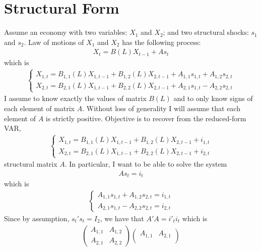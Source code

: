 \documentclass[14pt]{article}
\begin{document}
	
	\large{

\section*{Structural Form}

Assume an economy with two variables: $X_1$ and $X_2$; and two structural shocks: $s_1$ and $s_2$. Law of motions of $X_1$ and $X_2$ has the following process:
\begin{eqnarray}
X_t = B(L)X_{t-1} + As_t
\end{eqnarray}
which is
\begin{eqnarray}
\begin{cases}
X_{1,t} = B_{1,1}(L)X_{1,t-1} + B_{1,2}(L)X_{2,t-1} + A_{1,1}s_{1,t} + A_{1,2}s_{2,t} \\
X_{2,t} = B_{2,1}(L)X_{1,t-1} + B_{2,2}(L)X_{2,t-1} + A_{2,1}s_{1,t} - A_{2,2}s_{2,t}
\end{cases}
\end{eqnarray}
I assume to know exactly the values of matrix $B(L)$ and to only know signs of each element of matrix $A$. Without loss of generality I will assume that each element of $A$ is strictly positive. Objective is to recover from the reduced-form VAR,
\begin{eqnarray}
\begin{cases}
X_{1,t} = B_{1,1}(L)X_{1,t-1} + B_{1,2}(L)X_{2,t-1} + i_{1,t} \\
X_{2,t} = B_{2,1}(L)X_{1,t-1} + B_{2,2}(L)X_{2,t-1} + i_{2,t}
\end{cases}
\end{eqnarray}
structural matrix $A$. In particular, I want to be able to solve the system
\begin{eqnarray}
As_t = i_t
\end{eqnarray}
which is
\begin{eqnarray}
\begin{cases}
A_{1,1}s_{1,t} + A_{1,2}s_{2,t} = i_{1,t} \\
A_{2,1}s_{1,t} - A_{2,2}s_{2,t} = i_{2,t}
\end{cases}
\end{eqnarray}
Since by assumption, $s_t's_t = I_2$, we have that $A'A = i'_t i_t$ which is
\begin{eqnarray}
\begin{pmatrix}
A_{1,1} & A_{1,2} \\
A_{2,1} & A_{2,2}
\end{pmatrix} \begin{pmatrix}
A_{1,1} & A_{2,1} \\

\end{pmatrix}
\end{eqnarray}}
\end{document}
